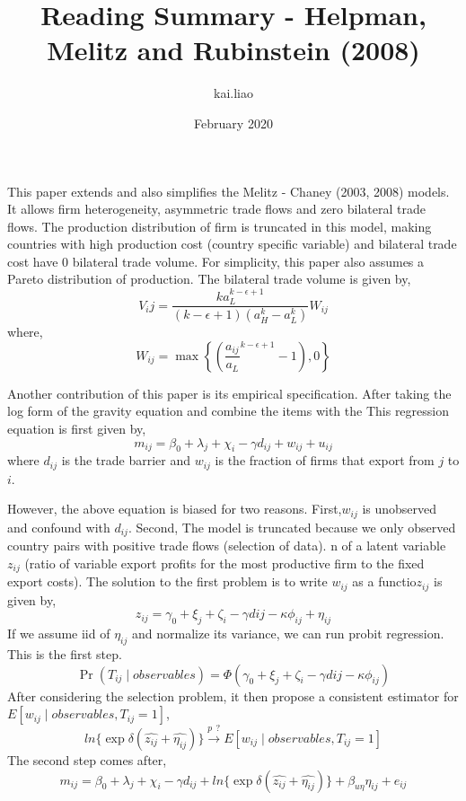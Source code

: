 \documentclass{article}
\title{Reading Summary - Helpman, Melitz and Rubinstein (2008)}
\author{kai.liao }
\date{February 2020}
\begin{document}
\maketitle

This paper extends and also simplifies the Melitz - Chaney (2003, 2008) models. It allows firm heterogeneity, asymmetric trade flows and zero bilateral trade flows. The production distribution of firm is truncated in this model, making countries with high production cost (country specific variable) and bilateral trade cost have 0 bilateral trade volume. For simplicity, this paper also assumes a Pareto distribution of production. The bilateral trade volume is given by,
\begin{equation}
    V_ij = \frac{ka_L^{k-\epsilon+1}}{(k-\epsilon+1)(a_H^k - a_L^k)}W_{ij}
\end{equation}
where,
\begin{equation*}
    W_{ij} = \max \left\{ \left( \frac{a_{ij}}{a_L}^{k-\epsilon+1} - 1 \right), 0 \right\}
\end{equation*}

Another contribution of this paper is its empirical specification. After taking the log form of the gravity equation and combine the items with the This regression equation is first given by,
\begin{equation}
    m_{ij} = \beta_0 + \lambda_j +\chi_i-\gamma d_{ij} + w_{ij} + u_{ij}
\end{equation}
where $d_{ij}$ is the trade barrier and $w_{ij}$ is the fraction of firms that export from $j$ to $i$.

However, the above equation is biased for two reasons. First,$w_{ij}$ is unobserved and confound with $d_{ij}$. Second, The model is truncated because we only observed country pairs with positive trade flows (selection of data). 
n of a latent variable $z_{ij}$ (ratio of variable export profits for the most productive firm to the fixed export costs). 
The solution to the first problem is to write $w_{ij}$ as a functio$z_{ij}$ is given by,
\begin{equation}
    z_{ij} = \gamma_0 + \xi_j +\zeta_i -\gamma d{ij} - \kappa \phi_{ij} + \eta_{ij}
\end{equation}
If we assume iid of $\eta_{ij}$ and normalize its variance, we can run probit regression. This is the first step.
\begin{equation}
    \Pr (T_{ij} \mid observables) = \Phi(\gamma_0 + \xi_j +\zeta_i -\gamma d{ij} - \kappa \phi_{ij})
\end{equation}
After considering the selection problem, it then propose a consistent estimator for $E[w_{ij} \mid observables, T_{ij} = 1]$,
\begin{equation}
    ln\{\exp{{\delta(\hat{z_{ij}}+\hat{\eta_{ij}})}}\} \xrightarrow{p~~?}E[w_{ij} \mid observables, T_{ij} = 1]
\end{equation}
The second step comes after,
\begin{equation}
    m_{ij} = \beta_0 + \lambda_j +\chi_i-\gamma d_{ij} + ln\{\exp{{\delta(\hat{z_{ij}}+\hat{\eta_{ij}})}}\} + \beta_{u\eta}\eta_{ij}+e_{ij}
\end{equation}
\end{document}

